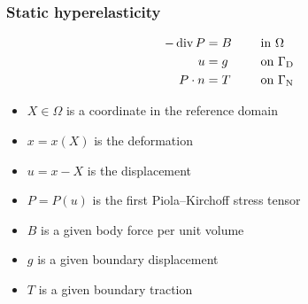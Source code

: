 \begin{frame}
  \frametitle{Static hyperelasticity}

  \begin{alignat*}{2}
    - \operatorname{\mathrm{div}} P &= B && \quad \text{ in } \Omega \\
    u &= g && \quad \text{ on } \Gamma_{\mathrm{D}} \\
    P \cdot n &= T && \quad \text{ on } \Gamma_{\mathrm{N}} \\
  \end{alignat*}
\vspace{-1.5cm}
  \begin{itemize}
  \item
    $X \in \Omega$ is a coordinate in the reference domain
  \item
    $x = x(X)$ is the deformation
  \item
    $u = x - X$ is the displacement
  \item
    $P = P(u)$ is the first Piola--Kirchoff stress tensor
  \item
    $B$ is a given body force per unit volume
  \item
    $g$ is a given boundary displacement
  \item
    $T$ is a given boundary traction
  \end{itemize}

\end{frame}
